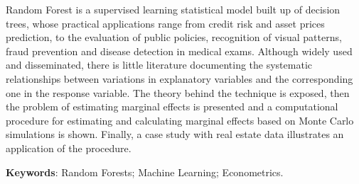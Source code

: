 \begin{resumo}[ABSTRACT] %
	
Random Forest is a supervised learning statistical model built up of decision trees, whose practical applications range from credit risk and asset prices prediction, to the evaluation of public policies, recognition of visual patterns, fraud prevention and disease detection in medical exams. Although widely used and disseminated, there is little literature documenting the systematic relationships between variations in explanatory variables and the corresponding one in the response variable. The theory behind the technique is exposed, then the problem of estimating marginal effects is presented and a computational procedure for estimating and calculating marginal effects based on Monte Carlo simulations is shown. Finally, a case study with real estate data illustrates an application of the procedure.

\textbf{Keywords}: Random Forests; Machine Learning; Econometrics. 	
\end{resumo}



